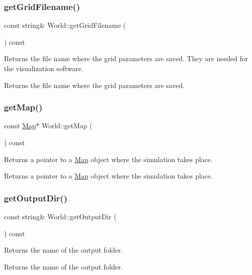 \subsubsection{\texorpdfstring{get\+Grid\+Filename()}{getGridFilename()}}
{\footnotesize\ttfamily const string\& World\+::get\+Grid\+Filename (\begin{DoxyParamCaption}{ }\end{DoxyParamCaption}) const}

Returns the file name where the grid parameters are saved. They are needed for the visualization software. \begin{DoxyReturn}{Returns}
the file name where the grid parameters are saved. 
\end{DoxyReturn}
\mbox{\label{class_world_a33b8543ee812ae4f8ff93329444da4cb}} 
\subsubsection{\texorpdfstring{get\+Map()}{getMap()}}
{\footnotesize\ttfamily const \hyperlink{class_map}{Map}$\ast$ World\+::get\+Map (\begin{DoxyParamCaption}{ }\end{DoxyParamCaption}) const}

Returns a pointer to a \hyperlink{class_map}{Map} object where the simulation takes place. \begin{DoxyReturn}{Returns}
a pointer to a \hyperlink{class_map}{Map} object where the simulation takes place. 
\end{DoxyReturn}
\mbox{\label{class_world_a2830d2aea7d91f98257c1e661527289e}} 
\subsubsection{\texorpdfstring{get\+Output\+Dir()}{getOutputDir()}}
{\footnotesize\ttfamily const string\& World\+::get\+Output\+Dir (\begin{DoxyParamCaption}{ }\end{DoxyParamCaption}) const}

Returns the name of the output folder. \begin{DoxyReturn}{Returns}
the name of the output folder. 
\end{DoxyReturn}
\mbox{\label{class_world_a5675c3a896891827dd59255a9761f08e}} 
